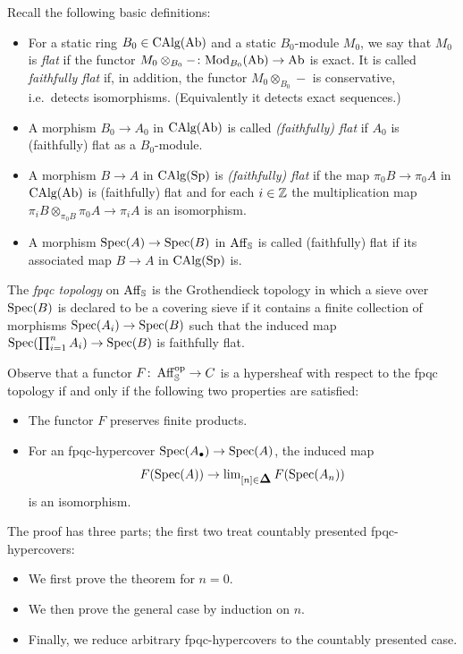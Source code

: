\documentclass[11pt]{book}
\begin{document}
	\begin{definition}
		Recall the following basic definitions:
		\begin{itemize}
			\item For a static ring $B_0 \in {\textup{CAlg}}({\textup{Ab}})$ and a static $B_0$-module $M_0$, we say that $M_0$ is \emph{flat} if the functor $M_0 \otimes_{B_0} -\colon {\textup{Mod}}_{B_0}({\textup{Ab}}) \to {\textup{Ab}}$ is exact. It is called \emph{faithfully flat} if, in addition, the functor $M_0 \otimes_{B_0} -$ is conservative, i.e.\ detects isomorphisms. (Equivalently it detects exact sequences.)
			\item A morphism $B_0 \to A_0$ in ${\textup{CAlg}}({\textup{Ab}})$ is called \emph{(faithfully) flat} if $A_0$ is (faithfully) flat as a $B_0$-module.
			\item A morphism $B \to A$ in ${\textup{CAlg}}({\textup{Sp}})$ is \emph{(faithfully) flat} if the map $\pi_0 B \to \pi_0 A$ in ${\textup{CAlg}}({\textup{Ab}})$ is (faithfully) flat and for each $i \in \operatorname{\mathbb Z}$ the multiplication map $\pi_i B \otimes_{\pi_0 B} \pi_0 A \to \pi_i A$ is an isomorphism.
			\item A morphism $\operatorname{Spec}(A) \to \operatorname{Spec}(B)$ in $\operatorname{Aff}_{\operatorname{\mathbb S}}$ is called (faithfully) flat if its associated map $B \to A$ in ${\textup{CAlg}}({\textup{Sp}})$ is.
		\end{itemize}
	\end{definition}

	\begin{definition}
		The \emph{fpqc topology} on $\operatorname{Aff}_{\operatorname{\mathbb S}}$ is the Grothendieck topology in which a sieve over $\operatorname{Spec}(B)$ is declared to be a covering sieve if it contains a finite collection of morphisms $\operatorname{Spec}(A_i) \to \operatorname{Spec}(B)$ such that the induced map $\operatorname{Spec}(\prod_{i=1}^n A_i) \to \operatorname{Spec}(B)$ is faithfully flat.
	\end{definition}

	Observe that a functor $F\colon \operatorname{Aff}_{\operatorname{\mathbb S}}^{\textup{op}} \to C$ is a hypersheaf with respect to the fpqc topology if and only if the following two properties are satisfied:
	\begin{itemize}
		\item The functor $F$ preserves finite products.
		\item For an fpqc-hypercover $\operatorname{Spec}(A_{\bullet}) \to \operatorname{Spec}(A)$, the induced map
		\[
			F(\Spec(A)) \to \lim_{[n] \in \simp} F(\Spec(A_n))
		\]
		is an isomorphism.
	\end{itemize}

	The proof has three parts; the first two treat countably presented fpqc-hypercovers:
	\begin{itemize}
		\item We first prove the theorem for $n = 0$.
		\item We then prove the general case by induction on $n$.
		\item Finally, we reduce arbitrary fpqc-hypercovers to the countably presented case.
	\end{itemize}
\end{document}

